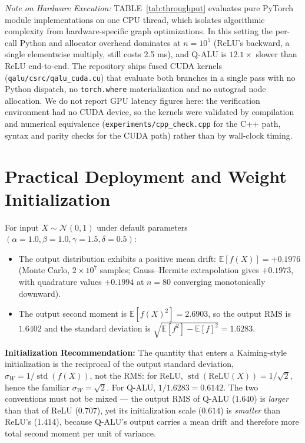 \documentclass[conference]{IEEEtran}
\begin{document}
\textit{Note on Hardware Execution:} TABLE~\ref{tab:throughput} evaluates pure PyTorch module implementations on one CPU thread, which isolates algorithmic complexity from hardware-specific graph optimizations. In this setting the per-call Python and allocator overhead dominates at $n = 10^{5}$ (ReLU's backward, a single elementwise multiply, still costs 2.5 ms), and Q-ALU is $12.1\times$ slower than ReLU end-to-end. The repository ships fused CUDA kernels (\texttt{qalu/csrc/qalu\_cuda.cu}) that evaluate both branches in a single pass with no Python dispatch, no \texttt{torch.where} materialization and no autograd node allocation. We do not report GPU latency figures here: the verification environment had no CUDA device, so the kernels were validated by compilation and numerical equivalence (\texttt{experiments/cpp\_check.cpp} for the C++ path, syntax and parity checks for the CUDA path) rather than by wall-clock timing.

\section{Practical Deployment and Weight Initialization}
For input $X \sim \mathcal{N}(0, 1)$ under default parameters $(\alpha=1.0, \beta=1.0, \gamma=1.5, \delta=0.5)$:
\begin{itemize}
    \item The output distribution exhibits a positive mean drift: $\mathbb{E}[f(X)] = +0.1976$ (Monte Carlo, $2 \times 10^{7}$ samples; Gauss--Hermite extrapolation gives $+0.1973$, with quadrature values $+0.1994$ at $n=80$ converging monotonically downward).
    \item The output second moment is $\mathbb{E}[f(X)^2] = 2.6903$, so the output RMS is $1.6402$ and the standard deviation is $\sqrt{\mathbb{E}[f^2] - \mathbb{E}[f]^2} = 1.6283$.
\end{itemize}

\textbf{Initialization Recommendation:}
The quantity that enters a Kaiming-style initialization is the reciprocal of the output standard deviation, $\sigma_W = 1/\operatorname{std}(f(X))$, not the RMS: for ReLU, $\operatorname{std}(\text{ReLU}(X)) = 1/\sqrt{2}$, hence the familiar $\sigma_W = \sqrt{2}$. For Q-ALU, $1/1.6283 = 0.6142$. The two conventions must not be mixed --- the output RMS of Q-ALU ($1.640$) is \emph{larger} than that of ReLU ($0.707$), yet its initialization scale ($0.614$) is \emph{smaller} than ReLU's ($1.414$), because Q-ALU's output carries a mean drift and therefore more total second moment per unit of variance.
\end{document}
